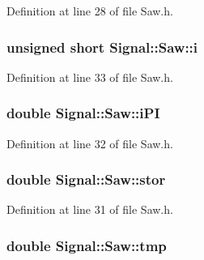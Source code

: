 Definition at line 28 of file Saw.\+h.

\hypertarget{class_signal_1_1_saw_a50612c8009e428dccb3e4b3b798bdf3d}{
\subsubsection[{i}]{\setlength{\rightskip}{0pt plus 5cm}unsigned short Signal\+::\+Saw\+::i\hspace{0.3cm}{\ttfamily [protected]}}}\label{class_signal_1_1_saw_a50612c8009e428dccb3e4b3b798bdf3d}


Definition at line 33 of file Saw.\+h.

\hypertarget{class_signal_1_1_saw_a75052e172f2d3c7ffc8daae2988f7305}{
\subsubsection[{i\+P\+I}]{\setlength{\rightskip}{0pt plus 5cm}double Signal\+::\+Saw\+::i\+P\+I\hspace{0.3cm}{\ttfamily [protected]}}}\label{class_signal_1_1_saw_a75052e172f2d3c7ffc8daae2988f7305}


Definition at line 32 of file Saw.\+h.

\hypertarget{class_signal_1_1_saw_a7c038cabed8c0b51136f16794c9142fd}{
\subsubsection[{stor}]{\setlength{\rightskip}{0pt plus 5cm}double Signal\+::\+Saw\+::stor\hspace{0.3cm}{\ttfamily [protected]}}}\label{class_signal_1_1_saw_a7c038cabed8c0b51136f16794c9142fd}


Definition at line 31 of file Saw.\+h.

\hypertarget{class_signal_1_1_saw_ad22f84065bf0bb32f437bc76709277f5}{
\subsubsection[{tmp}]{\setlength{\rightskip}{0pt plus 5cm}double Signal\+::\+Saw\+::tmp\hspace{0.3cm}{\ttfamily [protected]}}}\label{class_signal_1_1_saw_ad22f84065bf0bb32f437bc76709277f5}


